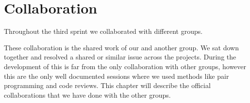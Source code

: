 
\chapter{Collaboration}
Throughout the third sprint we collaborated with different groups. 


These collaboration is the shared work of our and another group. We sat down together and resolved a shared or similar issue across the projects. During the development of \giraf this is far from the only collaboration with other groups, however this are the only well documented sessions where we used methods like pair programming and code reviews. This chapter will describe the official collaborations that we have done with the other groups.







